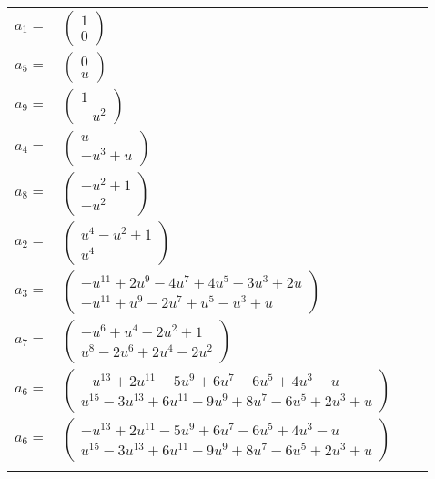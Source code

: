 \documentclass[1p]{elsarticle_modified}
\theoremstyle{definition}
\begin{document}
\begin{tabular}{m{7pt} m{180pt} m{7pt} m{180pt} }
\flushright $a_{1}=$&$\begin{pmatrix}1\\0\end{pmatrix}$ \\
\flushright $a_{5}=$&$\begin{pmatrix}0\\u\end{pmatrix}$ \\
\flushright $a_{9}=$&$\begin{pmatrix}1\\- u^2\end{pmatrix}$ \\
\flushright $a_{4}=$&$\begin{pmatrix}u\\- u^3+u\end{pmatrix}$ \\
\flushright $a_{8}=$&$\begin{pmatrix}- u^2+1\\- u^2\end{pmatrix}$ \\
\flushright $a_{2}=$&$\begin{pmatrix}u^4- u^2+1\\u^4\end{pmatrix}$ \\
\flushright $a_{3}=$&$\begin{pmatrix}- u^{11}+2 u^9-4 u^7+4 u^5-3 u^3+2 u\\- u^{11}+u^9-2 u^7+u^5- u^3+u\end{pmatrix}$ \\
\flushright $a_{7}=$&$\begin{pmatrix}- u^6+u^4-2 u^2+1\\u^8-2 u^6+2 u^4-2 u^2\end{pmatrix}$ \\
\flushright $a_{6}=$&$\begin{pmatrix}- u^{13}+2 u^{11}-5 u^9+6 u^7-6 u^5+4 u^3- u\\u^{15}-3 u^{13}+6 u^{11}-9 u^9+8 u^7-6 u^5+2 u^3+u\end{pmatrix}$\\ \flushright $a_{6}=$&$\begin{pmatrix}- u^{13}+2 u^{11}-5 u^9+6 u^7-6 u^5+4 u^3- u\\u^{15}-3 u^{13}+6 u^{11}-9 u^9+8 u^7-6 u^5+2 u^3+u\end{pmatrix}$\\&\end{tabular}
\end{document}
